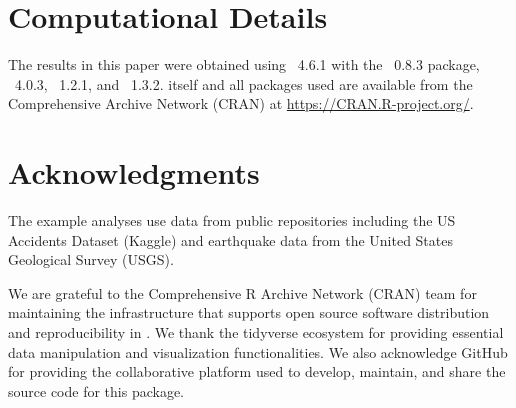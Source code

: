 \documentclass[article]{jss}
\begin{document}

\section*{Computational Details}

The results in this paper were obtained using
~4.6.1 with the
~0.8.3 package,
~4.0.3,
~1.2.1, and
~1.3.2.
 itself and all packages used are available from the Comprehensive
 Archive Network (CRAN) at
\url{https://CRAN.R-project.org/}.



\section*{Acknowledgments}

The example analyses use data from public repositories including the US Accidents Dataset (Kaggle) and earthquake data from the United States Geological Survey (USGS).

We are grateful to the Comprehensive R Archive Network (CRAN) \citep{R-base} team for maintaining the infrastructure that supports open source software distribution and reproducibility in . We thank the tidyverse \citep{wickham2019welcome} ecosystem for providing essential data manipulation and visualization functionalities. We also acknowledge GitHub for providing the collaborative platform used to develop, maintain, and share the source code for this package.







\newpage
\end{document}
